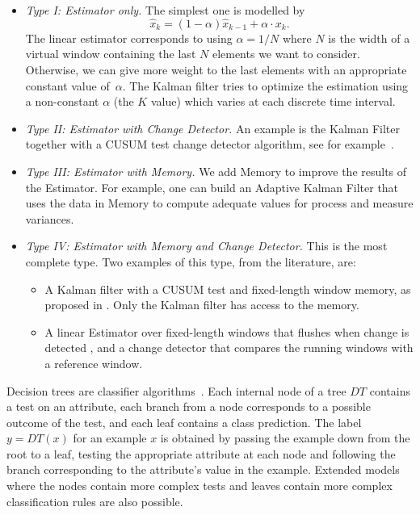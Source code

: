 \begin{itemize}
\item {\em Type I: Estimator only.} The simplest one is modelled by 
$$
\hat{x}_k= (1-\alpha)\hat{x}_{k-1}+\alpha \cdot x_k.
$$ 
The linear estimator corresponds to using  $\alpha=1/N$ where $N$ is the width of a virtual window 
containing the last $N$ elements we want to consider.
Otherwise, we can give more weight to the last elements with an appropriate constant value of~$\alpha$. 
The Kalman filter tries to optimize the estimation using a non-constant $\alpha$ (the $K$ value)
which varies at each discrete time interval. 

\item {\em Type II: Estimator with Change Detector.} 
An example is the Kalman Filter together with a CUSUM test change detector algorithm, 
see for example~\cite{jacob-04}.

\item {\em Type III: Estimator with Memory.} We add Memory to improve 
the results of the Estimator. For example, 
one can build an Adaptive Kalman Filter that uses the data in Memory to 
compute adequate values for process and measure variances.  

\item {\em Type IV: Estimator with Memory and Change Detector.} 
This is the most complete type. Two examples of this type, from the literature, are:
%
\begin{itemize}
\item A Kalman filter with a CUSUM test and fixed-length window memory, as proposed in \cite{SchonEG:05}. 
Only the Kalman filter has access to the memory.
\item A linear Estimator over fixed-length windows that flushes when change is detected \cite{kifer-detecting}, 
and a change detector that compares the running windows with a reference window. 
\end{itemize}
\end{itemize}
%

Decision trees are classifier algorithms~\cite{cart94,Quinlan}. Each internal node of a tree $DT$
contains a test on an attribute, each branch from a node corresponds to a possible outcome of the test,
and each leaf contains a class prediction. The label $y = DT(x)$ for an example $x$ is obtained
by passing the example down from the root to a leaf, testing the appropriate attribute at
each node and following the branch corresponding to the attribute's value in the example.
Extended models where the nodes contain more complex tests and leaves contain 
more complex classification rules are also possible. 

